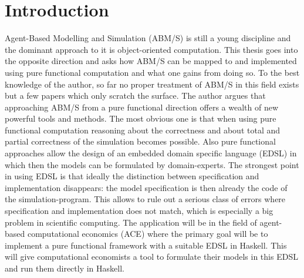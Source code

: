 \section{Introduction}
Agent-Based Modelling and Simulation (ABM/S) is still a young discipline and the dominant approach to it is object-oriented computation. This thesis goes into the opposite direction and asks how ABM/S can be mapped to and implemented using pure functional computation and what one gains from doing so. To the best knowledge of the author, so far no proper treatment of ABM/S in this field exists but a few papers which only scratch the surface. The author argues that approaching ABM/S from a pure functional direction offers a wealth of new powerful tools and methods. The most obvious one is that when using pure functional computation reasoning about the correctness and about total and partial correctness of the simulation becomes possible. Also pure functional approaches allow the design of an embedded domain specific language (EDSL) in which then the models can be formulated by domain-experts. The strongest point in using EDSL is that ideally the distinction between specification and implementation disappears: the model specification is then already the code of the simulation-program. This allows to rule out a serious class of errors where specification and implementation does not match, which is especially a big problem in scientific computing. The application will be in the field of agent-based computational economics (ACE) where the primary goal will be to implement a pure functional framework with a suitable EDSL in Haskell. This will give computational economists a tool to formulate their models in this EDSL and run them directly in Haskell.

